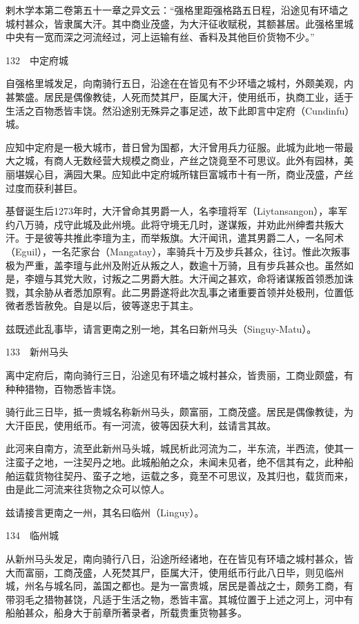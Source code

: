 \documentclass[12pt,UTF8]{ctexbook}
\begin{document}
剌木学本第二卷第五十一章之异文云：“强格里距强格路五日程，沿途见有环墙之城村甚众，皆隶属大汗。其中商业茂盛，为大汗征收赋税，其额甚居。此强格里城中央有一宽而深之河流经过，河上运输有丝、香料及其他巨价货物不少。”





132　中定府城

自强格里城发足，向南骑行五日，沿途在在皆见有不少环墙之城村，外颇美观，内甚繁盛。居民是偶像教徒，人死而焚其尸，臣属大汗，使用纸币，执商工业，适于生活之百物悉皆丰饶。然沿途别无殊异之事足述，故下此即言中定府（Cundinfu）城。

应知中定府是一极大城市，昔日曾为国都，大汗曾用兵力征服。此城为此地一带最大之城，有商人无数经营大规模之商业，产丝之饶竟至不可思议。此外有园林，美丽堪娱心目，满园大果。应知此中定府城所辖巨富城市十有一所，商业茂盛，产丝过度而获利甚巨。

基督诞生后1273年时，大汗曾命其男爵一人，名李璮将军（Liytansangon），率军约八万骑，戍守此城及此州境。此将守境无几时，遂谋叛，并劝此州绅耆共叛大汗。于是彼等共推此李璮为主，而举叛旗。大汗闻讯，遣其男爵二人，一名阿术（Eguil），一名茫家台（Mangatay），率骑兵十万及步兵甚众，往讨。惟此次叛事极为严重，盖李璮与此州及附近从叛之人，数逾十万骑，且有步兵甚众也。虽然如是，李嬗与其党大败，讨叛之二男爵大胜。大汗闻之甚欢，命将诸谋叛首领悉加诛戮，其余胁从者悉加原宥。此二男爵遂将此次乱事之诸重要首领并处极刑，位置低微者悉皆赦免。自是以后，彼等遂忠于其主。

兹既述此乱事毕，请言更南之别一地，其名曰新州马头（Singuy-Matu）。





133　新州马头

离中定府后，南向骑行三日，沿途见有环墙之城村甚众，皆贵丽，工商业颇盛，有种种猎物，百物悉皆丰饶。

骑行此三日毕，抵一贵城名称新州马头，颇富丽，工商茂盛。居民是偶像教徒，为大汗臣民，使用纸币。有一河流，彼等因获大利，兹请言其故。

此河来自南方，流至此新州马头城，城民析此河流为二，半东流，半西流，使其一注蛮子之地，一注契丹之地。此城船舶之众，未闻未见者，绝不信其有之，此种船舶运载货物往契丹、蛮子之地，运载之多，竟至不可思议，及其归也，载货而来，由是此二河流来往货物之众可以惊人。

兹请接言更南之一州，其名曰临州（Linguy）。





134　临州城

从新州马头发足，南向骑行八日，沿途所经诸地，在在皆见有环墙之城村甚众，皆大而富丽，工商茂盛，人死焚其尸，臣属大汗，使用纸币行此八日毕，则见临州城，州名与城名同，盖国之都也。是为一富贵城，居民是善战之士，颇务工商，有带羽毛之猎物甚饶，凡适于生活之物，悉皆丰富。其城位置于上述之河上，河中有船舶甚众，船身大于前章所著录者，所载贵重货物甚多。
\end{document}

